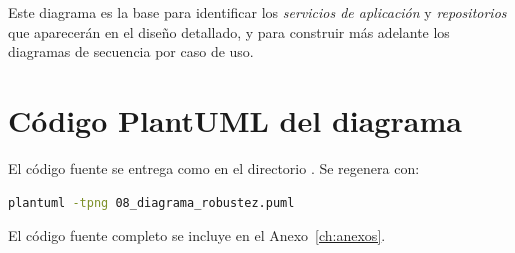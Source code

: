 Este diagrama es la base para identificar los \textit{servicios de aplicación} y \textit{repositorios} que aparecerán en el diseño detallado, y para construir más adelante los diagramas de secuencia por caso de uso.

\section{Código PlantUML del diagrama}

El código fuente se entrega como  en el directorio . Se regenera con:

\begin{lstlisting}[language=bash]
plantuml -tpng 08_diagrama_robustez.puml
\end{lstlisting}

El código fuente completo se incluye en el Anexo~\ref{ch:anexos}.
